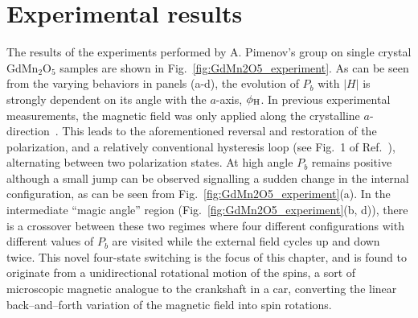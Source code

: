 \section{Experimental results}
\begin{figure*}[t]
    \centering
\caption{ \label{fig:GdMn2O5_experiment} {\bf Experimental measurements of the electric polarization.} (a) At higher temperatures only a small step is seen at the transition that shows some hysteresis and the two-state switching; (b) 4-state switching starts to appear approximately from $T=5$~K.(c) four-state hysteresis loop is clearly seen at $T=2.3$~K with the magnetic field at the ``magic'' angle;  
(d-f) Field dependence of the electric polarization of GdMn$_2$O$_5$ for different off-axis orientations of the applied magnetic field. (d,f): Conventional two-state switching is observed if magnetic field is (d) far away from the ``magic" direction  or (f) very close to the crystallographic $a$-axis. (e,g): Unusual four-state hysteresis loop for the magnetic field direction close to the magic angle of $\pm 9^o$. The inset shows the sequence of the magnetic field-sweeps. The labels 1-4 mark the four polarization states. The arrows show the direction of magnetic field-change during the sweep. The experiments have been done at $T=2.3$\,K. }
\end{figure*}
The results of the experiments performed by A. Pimenov's group on single crystal GdMn$_2$O$_5$ samples are shown in Fig.~\ref{fig:GdMn2O5_experiment}. As can be seen from the varying behaviors in panels (a-d), the evolution of $P_b$ with $|H|$ is strongly dependent on its angle with the $a$-axis, $\phi_{\rm H}$.
In previous experimental measurements, the magnetic field was only applied along the crystalline $a$-direction~\cite{Lee13}.
This leads to the aforementioned reversal and restoration of the polarization, and a relatively conventional hysteresis loop (see Fig.~1 of Ref.~\cite{Lee13}), alternating between two polarization states.
At high angle $P_b$ remains positive although a small jump can be observed signalling a sudden change in the internal configuration, as can be seen from Fig.~\ref{fig:GdMn2O5_experiment}(a).
In the intermediate ``magic angle'' region (Fig.~\ref{fig:GdMn2O5_experiment}(b, d)), there is a crossover between these two regimes  where four different configurations with different values of $P_b$ are visited while the external field cycles up and down twice.
This novel four-state switching is the focus of this chapter, and is found to originate from a unidirectional rotational motion of the spins, a sort of microscopic magnetic analogue to the crankshaft in a car, converting the linear back--and--forth variation of the magnetic field into spin rotations.
